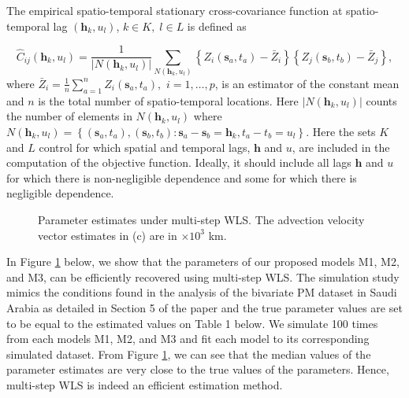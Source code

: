 \documentclass[12pt]{article}
\newcommand{\0}{\mathbf{0}}
\begin{document}
The empirical spatio-temporal stationary cross-covariance function at spatio-temporal lag $(\mathbf{h}_k,u_l)$, $k \in K,\;l\in L$ is defined as

\begin{equation}\label{eqn:empirical_covariance}
\widehat{C}_{ij}(\mathbf{h}_k,u_l)=\frac{1}{|N(\mathbf{h}_k,u_l)|}\sum_{N(\mathbf{h}_k,u_l)}\left\{Z_{i}(\mathbf{s}_a,t_a)-\bar{Z}_{i}\right\}\left\{Z_{j}(\mathbf{s}_b,t_b)-\bar{Z}_{j}\right\},
\end{equation}
where $\bar{Z}_{i}=\frac{1}{n}\sum_{a=1}^{n} Z_i(\mathbf{s}_a,t_a),$ $i=1,\ldots,p$, is an estimator of the constant mean and $n$ is the total number of spatio-temporal locations. Here $|N(\mathbf{h}_k,u_l)|$ counts the number of elements in $N(\mathbf{h}_k,u_l)$ where $N(\mathbf{h}_k,u_l)=\left\{(\mathbf{s}_a,t_a),(\mathbf{s}_b,t_b): \mathbf{s}_a-\mathbf{s}_b =\mathbf{h}_k, t_a-t_b =u_l \right\}$. Here the sets $K$ and $L$ control for which spatial and temporal lags, $\mathbf{h}$ and $u$, are included in the computation of the objective function. Ideally, it should include all lags $\mathbf{h}$ and $u$ for which there is non-negligible dependence and some for which there is negligible dependence. 

\begin{figure}[tb!]
 \centering
 \quad
    \quad
    \quad
     \caption{\small Parameter estimates under multi-step WLS. The advection velocity vector estimates in (c) are in $\times 10^3$ km.}
    \label{fig:wls_spatial}
\end{figure}

In Figure \ref{fig:wls_spatial} below, we show that the parameters of our proposed models M1, M2, and M3, can be efficiently recovered using multi-step WLS. The simulation study mimics the conditions found in the analysis of the bivariate PM dataset in Saudi Arabia as detailed in Section 5 of the paper and the true parameter values are set to be equal to the estimated values on Table 1 below. We simulate 100 times from each models M1, M2, and M3 and fit each model to its corresponding simulated dataset. From Figure \ref{fig:wls_spatial}, we can see that the median values of the parameter estimates are very close to the true values of the parameters. Hence, multi-step WLS is indeed an efficient estimation method.
\end{document}
